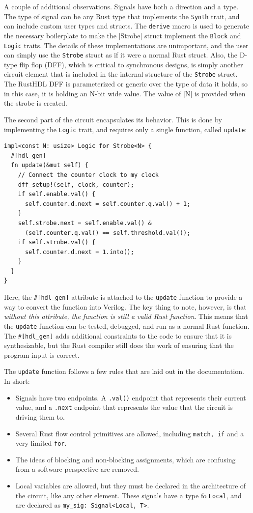 \documentclass[conference]{IEEEtran}
\begin{document}
A couple of additional observations.  Signals have both a direction and a type.  The type of
signal can be any Rust type that implements the \verb|Synth| trait, and can include custom user
types and structs.  The \verb|derive| macro is used to generate the necessary boilerplate to make the 
|Strobe| struct implement the \verb|Block| and \verb|Logic| traits.  The details of these implementations are
unimportant, and the user can simply use the \verb|Strobe| struct as if it were a normal Rust struct.  Also,
the D-type flip flop (DFF), which is critical to synchronous designs, is simply another circuit element that
is included in the internal structure of the \verb|Strobe| struct.  The RustHDL DFF is parameterized or 
generic over the type of data it holds, so in this case, it is holding an N-bit wide value.  The value of
|N| is provided when the strobe is created.

The second part of the circuit encapsulates its behavior.  This is done by implementing the \verb|Logic| trait,
and requires only a single function, called \verb|update|:

\begin{verbatim}
impl<const N: usize> Logic for Strobe<N> {
  #[hdl_gen]
  fn update(&mut self) {
    // Connect the counter clock to my clock
    dff_setup!(self, clock, counter);
    if self.enable.val() {
      self.counter.d.next = self.counter.q.val() + 1;
    }
    self.strobe.next = self.enable.val() & 
      (self.counter.q.val() == self.threshold.val());
    if self.strobe.val() {
      self.counter.d.next = 1.into();
    }
  }
}
\end{verbatim}

Here, the \verb|#[hdl_gen]| attribute is attached to the \verb|update| function to provide a way to convert the function
into Verilog.  The key thing to note, however, is that \emph{without this attribute, the function is still a valid Rust function}.
This means that the \verb|update| function can be tested, debugged, and run as a normal Rust function.  The \verb|#[hdl_gen]| adds
additional constraints to the code to ensure that it is synthesizable, but the Rust compiler still does the work of ensuring that the 
program input is correct.

The \verb|update| function follows a few rules that are laid out in the documentation.  In short:
\begin{itemize}
  \item Signals have two endpoints.  A \verb|.val()| endpoint that represents their current value, and a \verb|.next| endpoint that represents
    the value that the circuit is driving them to.
  \item Several Rust flow control primitives are allowed, including \verb|match, if| and a very limited \verb|for|.  
  \item The ideas of blocking and non-blocking assignments, which are confusing from a software perspective are removed.  
  \item Local variables are allowed, but they must be declared in the architecture of the circuit, like any other element.
  These signals have a type fo \verb|Local|, and are declared as \verb|my_sig: Signal<Local, T>|.
\end{itemize}
\end{document}
